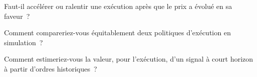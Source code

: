 \begin{interviewq}\label{iq:mx:beyond-almgren-chriss:4}
Faut-il accélérer ou ralentir une exécution après que le prix a évolué en sa faveur~?
\end{interviewq}

\begin{interviewq}\label{iq:mx:beyond-almgren-chriss:5}
Comment compareriez-vous équitablement deux politiques d'exécution en simulation~?
\end{interviewq}

\begin{interviewq}\label{iq:mx:beyond-almgren-chriss:6}
Comment estimeriez-vous la valeur, pour l'exécution, d'un signal à court horizon à partir d'ordres historiques~?
\end{interviewq}

